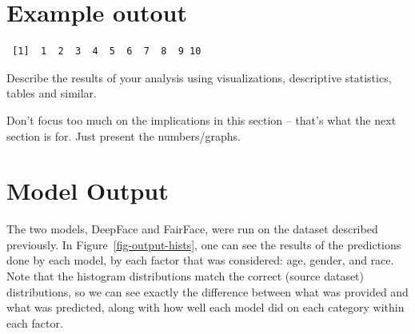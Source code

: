 \documentclass[
  letterpaper,
  DIV=11,
  numbers=noendperiod]{scrreprt}
\begin{document}
\section{Example outout}

\begin{verbatim}
 [1]  1  2  3  4  5  6  7  8  9 10
\end{verbatim}

\begin{tcolorbox}[enhanced jigsaw, bottomrule=.15mm, left=2mm, bottomtitle=1mm, leftrule=.75mm, coltitle=black, toprule=.15mm, breakable, opacitybacktitle=0.6, titlerule=0mm, colback=white, colbacktitle=quarto-callout-note-color!10!white, toptitle=1mm, arc=.35mm, rightrule=.15mm, colframe=quarto-callout-note-color-frame, opacityback=0, title=\textcolor{quarto-callout-note-color}{\faInfo}\hspace{0.5em}{From the report requirements}]

Describe the results of your analysis using visualizations, descriptive
statistics, tables and similar.

Don't focus too much on the implications in this section -- that's what
the next section is for. Just present the numbers/graphs.

\end{tcolorbox}

\hypertarget{model-output}{%
\section{Model Output}\label{model-output}}

The two models, DeepFace and FairFace, were run on the dataset described
previously. In Figure~\ref{fig-output-hists}, one can see the results of
the predictions done by each model, by each factor that was considered:
age, gender, and race. Note that the histogram distributions match the
correct (source dataset) distributions, so we can see exactly the
difference between what was provided and what was predicted, along with
how well each model did on each category within each factor.
\end{document}
